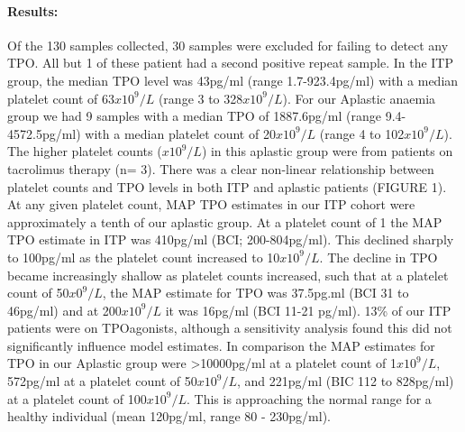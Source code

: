 \documentclass[11pt]{article}
\begin{document}
\paragraph{Results:} Of the 130 samples collected, 30 samples were excluded for failing to detect any TPO. All but 1 of these patient had a second positive repeat sample. In the ITP group, the median TPO level was 43pg/ml (range 1.7-923.4pg/ml) with a median platelet count of 63$x10^9/L$ (range 3 to 328$x10^9/L$). For our Aplastic anaemia group we had 9 samples with a median TPO of 1887.6pg/ml (range 9.4-4572.5pg/ml) with a median platelet count of 20$x10^9/L$ (range 4 to 102$x10^9/L$). The higher platelet counts ($x10^9/L$) in this aplastic group were from patients on tacrolimus therapy (n= 3). There was a clear non-linear relationship between platelet counts and TPO levels in both ITP and aplastic patients (FIGURE 1). At any given platelet count, MAP TPO estimates in our ITP cohort were approximately a tenth of our aplastic group.  At a platelet count of 1 the MAP TPO estimate in ITP was 410pg/ml (BCI; 200-804pg/ml). This declined sharply to 100pg/ml as the platelet count increased to 10$x10^9/L$. The decline in TPO became increasingly shallow as platelet counts increased, such that at a platelet count of 50$x0^9/L$, the MAP estimate for TPO was 37.5pg.ml (BCI 31 to 46pg/ml) and at 200$x10^9/L$ it was 16pg/ml (BCI 11-21 pg/ml). 13\% of our ITP patients were on TPOagonists, although a sensitivity analysis found this did not significantly influence model estimates. In comparison the MAP estimates for TPO in our Aplastic group were >10000pg/ml at a platelet count of 1$x10^9/L$, 572pg/ml at a platelet count of 50$x10^9/L$, and 221pg/ml (BIC 112 to 828pg/ml) at a platelet count of 100$x10^9/L$. This is approaching the normal range for a healthy individual (mean 120pg/ml, range 80 - 230pg/ml).

\end{document}
